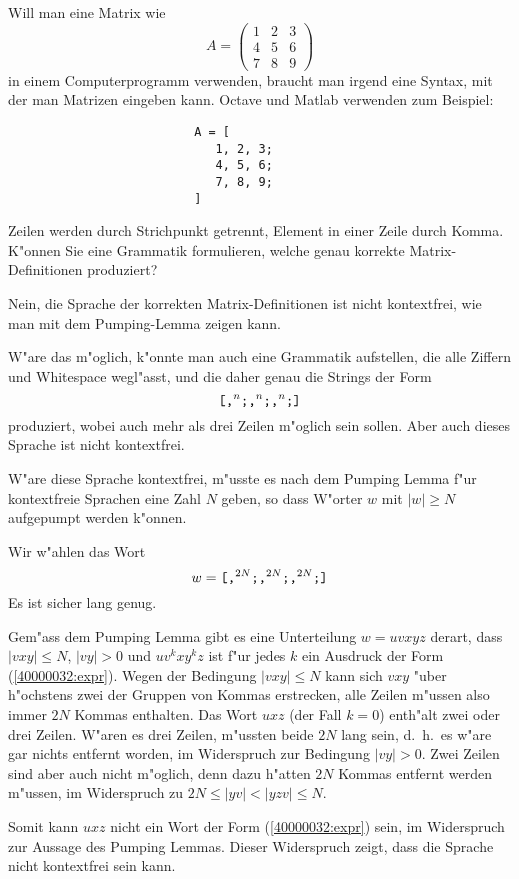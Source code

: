 Will man eine Matrix wie
\[
A=\begin{pmatrix}
1&2&3\\
4&5&6\\
7&8&9
\end{pmatrix}
\]
in einem Computerprogramm verwenden, braucht man irgend eine Syntax,
mit der man Matrizen eingeben kann. Octave und Matlab verwenden zum
Beispiel:
\begin{verbatim}
                          A = [
                             1, 2, 3;
                             4, 5, 6;
                             7, 8, 9;
                          ]
\end{verbatim}
Zeilen werden durch Strichpunkt getrennt, Element in einer Zeile durch Komma.
K"onnen Sie eine Grammatik formulieren, welche genau korrekte
Matrix-Definitionen produziert?

\begin{loesung}
Nein, die Sprache der korrekten Matrix-Definitionen ist nicht
kontextfrei, wie man mit dem Pumping-Lemma zeigen kann.

W"are das m"oglich, k"onnte man auch eine Grammatik aufstellen, die
alle Ziffern und Whitespace wegl"asst, und die daher genau die Strings der Form 
\begin{equation}
\text{\tt [}
\text{\tt ,}^n
\text{\tt ;}
\text{\tt ,}^n
\text{\tt ;}
\text{\tt ,}^n
\text{\tt ;}
\text{\tt ]}
\label{40000032:expr}
\end{equation}
produziert, wobei auch mehr als drei Zeilen m"oglich
sein sollen. Aber auch dieses Sprache ist nicht kontextfrei. 

W"are diese Sprache kontextfrei, m"usste es nach dem Pumping Lemma
f"ur kontextfreie Sprachen eine Zahl $N$ geben, so dass W"orter $w$
mit $|w|\ge N$ aufgepumpt werden k"onnen. 

Wir w"ahlen das Wort
\[
w=
\text{\tt [}
\text{\tt ,}^{2N}
\text{\tt ;}
\text{\tt ,}^{2N}
\text{\tt ;}
\text{\tt ,}^{2N}
\text{\tt ;}
\text{\tt ]}
\]
Es ist sicher lang genug.

Gem"ass dem Pumping Lemma gibt es eine Unterteilung $w=uvxyz$ derart,
dass $|vxy|\le N$, $|vy|>0$ und $uv^kxy^kz$ ist f"ur jedes $k$
ein Ausdruck der Form
(\ref{40000032:expr}).
Wegen der Bedingung $|vxy|\le N$ kann sich $vxy$ "uber h"ochstens zwei
der Gruppen von Kommas erstrecken, alle Zeilen m"ussen
also immer $2N$ Kommas enthalten.
Das Wort $uxz$ (der Fall $k=0$) enth"alt zwei oder drei Zeilen.
W"aren es drei Zeilen, m"ussten beide $2N$ lang sein, d.~h.~es
w"are gar nichts entfernt worden, im Widerspruch zur Bedingung
$|vy|>0$.
Zwei Zeilen sind aber auch nicht m"oglich, denn dazu
h"atten $2N$ Kommas entfernt werden m"ussen, im Widerspruch
zu $2N\le |yv|<|yzv|\le N$.

Somit kann $uxz$ nicht ein Wort der Form
(\ref{40000032:expr})
sein, im Widerspruch zur Aussage des Pumping Lemmas.
Dieser Widerspruch zeigt, dass die Sprache nicht kontextfrei
sein kann.
\end{loesung}

